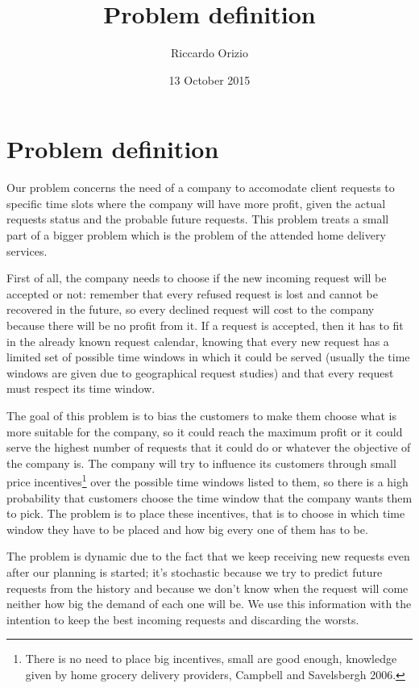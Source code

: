 \documentclass[10pt, letterpaper]{article}
\title{Problem definition}
\author{Riccardo Orizio}
\date{13 October 2015}
\begin{document}
\maketitle

\section{Problem definition}

Our problem concerns the need of a company to accomodate client requests to 
specific time slots where the company will have more profit, given the actual
requests status and the probable future requests.
This problem treats a small part of a bigger problem which is the problem of 
the attended home delivery services.

First of all, the company needs to choose if the new incoming request will be 
accepted or not: remember that every refused request is lost and cannot be 
recovered in the future, so every declined request will cost to the company 
because there will be no profit from it.
If a request is accepted, then it has to fit in the already known request 
calendar, knowing that every new request has a limited set of possible time 
windows in which it could be served (usually the time windows are given due
to geographical request studies) and that every request must respect its time 
window.

The goal of this problem is to bias the customers to make them choose what is 
more suitable for the company, so it could reach the maximum profit or it 
could serve the highest number of requests that it could do or whatever the 
objective of the company is.
The company will try to influence its customers through small price 
incentives\footnote{There is no need to place big incentives, small are good 
enough, knowledge given by home grocery delivery providers, Campbell and 
Savelsbergh 2006.} over the possible time windows listed to them, so there is 
a high probability that customers choose the time window that the company 
wants them to pick.
The problem is to place these incentives, that is to choose in which time 
window they have to be placed and how big every one of them has to be.

The problem is dynamic due to the fact that we keep receiving new requests even 
after our planning is started; it's stochastic because we try to predict future 
requests from the history and because we don't know when the request will come 
neither how big the demand of each one will be.
We use this information with the intention to keep the best incoming requests 
and discarding the worsts.
\end{document}
